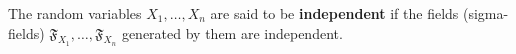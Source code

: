 The random variables $X_1, \ldots, X_n$ are said to be \textbf{independent} if the fields (sigma-fields) $\mathfrak{F}_{X_1}, \ldots, \mathfrak{F}_{X_n}$ generated by them are independent.
